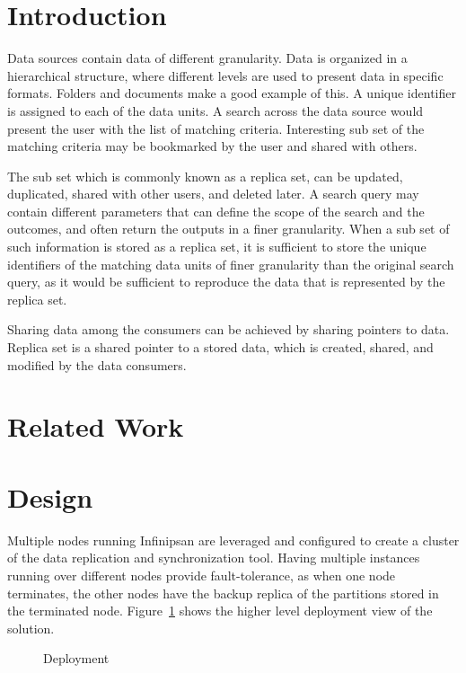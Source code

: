 \documentclass[conference]{IEEEtran}
\begin{document}
\IEEEpeerreviewmaketitle

\section{Introduction}
Data sources contain data of different granularity. Data is organized in a hierarchical structure, where different levels are used to present data in specific formats. Folders and documents make a good example of this. A unique identifier is assigned to each of the data units. A search across the data source would present the user with the list of matching criteria. Interesting sub set of the matching criteria may be bookmarked by the user and shared with others. 

The sub set which is commonly known as a replica set, can be updated, duplicated, shared with other users, and deleted later. A search query may contain different parameters that can define the scope of the search and the outcomes, and often return the outputs in a finer granularity. When a sub set of such information is stored as a replica set, it is sufficient to store the unique identifiers of the matching data units of finer granularity than the original search query, as it would be sufficient to reproduce the data that is represented by the replica set.

Sharing data among the consumers can be achieved by sharing pointers to data. Replica set is a shared pointer to a stored data, which is created, shared, and modified by the data consumers.
%
\section{Related Work}


\section{Design}
Multiple nodes running Infinipsan are leveraged and configured to create a cluster of the data replication and synchronization tool. Having multiple instances running over different nodes provide fault-tolerance, as when one node terminates, the other nodes have the backup replica of the partitions stored in the terminated node. Figure~\ref{fig:deployment} shows the higher level deployment view of the solution.
\begin{figure}[!htbp]
\begin{center}
\end{center}
 \caption{Deployment}
 \label{fig:deployment}
\end{figure}
\end{document}
